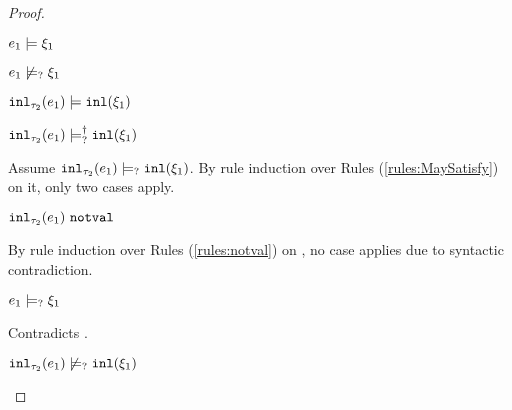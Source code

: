 \begin{proof}
\begin{byCases}
\begin{byCases}
        \begin{byCases}
        \item[\csatisfy{e_1}{\xi_1}]
            \begin{pfsteps*}
            \item $e_1 \models \xi_1$  
            \item $e_1 \not\models_{?} \xi_1$  
            \item $\mathtt{inl}_{\tau_2}({e_1}) \models \mathtt{inl}(\xi_1)$  
            \item $\mathtt{inl}_{\tau_2}({e_1}) \models_{?}^{\dag} \mathtt{inl}(\xi_1)$ 
            \end{pfsteps*}
            Assume $\mathtt{inl}_{\tau_2}({e_1}) \models_{?} \mathtt{inl}(\xi_1)$. By rule induction over Rules (\ref{rules:MaySatisfy}) on it, only two cases apply.
            \begin{byCases}
            \item[\text{(\ref{rule:CMSNotVal})}]
                \begin{pfsteps*}
                \item $\mathtt{inl}_{\tau_2}({e_1}) ~\mathtt{notval}$  
                \end{pfsteps*}
                By rule induction over Rules (\ref{rules:notval}) on , no case applies due to syntactic contradiction.
            \item[\text{(\ref{rule:CMSInl})}]
                \begin{pfsteps*}
                \item $e_1 \models_{?} \xi_1$
                \end{pfsteps*}
                Contradicts .
            \end{byCases}
            \begin{pfsteps*}
            \item $\mathtt{inl}_{\tau_2}({e_1}) \not\models_{?} \mathtt{inl}(\xi_1)$ 
            \end{pfsteps*}
            

\end{byCases}
\end{byCases}
\end{byCases}
\end{proof}
